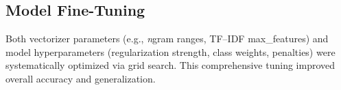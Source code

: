 \subsection{Model Fine-Tuning}  %
Both vectorizer parameters (e.g., \emph{n}\textendash gram ranges, TF–IDF
max\_features) and model hyperparameters (regularization strength, class
weights, penalties) were systematically optimized via grid search. This
comprehensive tuning improved overall accuracy and generalization.
